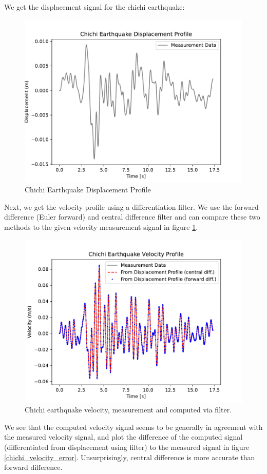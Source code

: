 We get the displacement signal for the chichi earthquake:

\begin{figure}[ht!]
    \centering
    \includegraphics*[width=0.75\columnwidth]{chichi_displacement.pdf}
    \caption{Chichi Earthquake Displacement Profile}
\end{figure}

Next, we get the velocity profile using a differentiation filter. 
We use the forward difference (Euler forward) and central difference filter and can compare these two
methods to the given velocity measurement signal in figure \ref{chichi_velocity}. 

\begin{figure}
    \centering
    \includegraphics*[width=0.75\columnwidth]{chichi_velocity.pdf}
    \caption{Chichi earthquake velocity, measurement and computed via filter.}
    \label{chichi_velocity}
\end{figure}

We see that the computed velocity signal seems to be generally in agreement with the measured velocity
signal, and plot the difference of the computed signal (differentiated from displacement using filter) 
to the measured signal in figure \ref{chichi_velocity_error}. 
Unsurprisingly, central difference is more accurate than forward difference.

